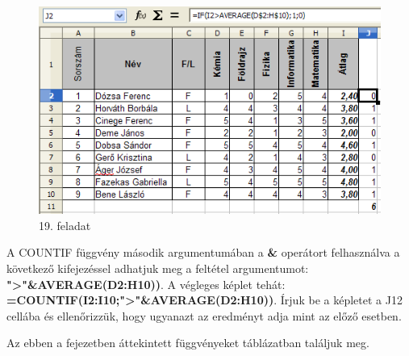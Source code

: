 \begin{figure}[!h]
\begin{center}
\includegraphics[width=13.254cm]{oocalcv1-img93.png}
\caption{19. feladat}\label{19-feladat}
\end{center}
\end{figure}

A COUNTIF függvény második argumentumában a \textbf{\&}
operátort felhasználva a következő kifejezéssel adhatjuk
meg a feltétel argumentumot:
\textsf{\textbf{">"\&AVERAGE(D2:H10))}}.
A végleges képlet tehát:
\textsf{\textbf{=COUNTIF(I2:I10;">"\&AVERAGE(D2:H10))}}.
Írjuk be a képletet a J12 cellába és ellenőrizzük, hogy
ugyanazt az eredményt adja mint az előző esetben.

Az ebben a fejezetben áttekintett függvényeket
 táblázatban találjuk meg.


